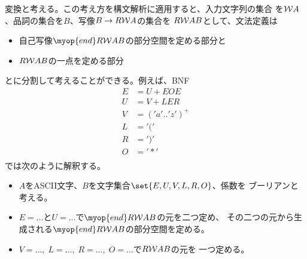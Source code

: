 \begin{todo}[やること]
\begin{description}
			変換と考える。この考え方を構文解析に適用すると、入力文字列の集合
			を$\mathcal{W}{A}$、品詞の集合を$B$、写像$B\to R\mathcal{W}{A}$の集合を
			$R\mathcal{W}{A}B$として、文法定義は
			\begin{itemize}\setlength{\itemsep}{-1mm} %
				\item 自己写像$\myop{end}R\Word{A}B$の部分空間を定める部分と
				\item $R\mathcal{W}{A}B$の一点を定める部分
			\end{itemize} %
			とに分割して考えることができる。例えば、BNF
			\begin{equation*}\begin{split} %
				E &= U + EOE \\
				U &= V + LER \\
				V &= ('a'..'z')^+ \\
				L &= '(' \\
				R &= ')' \\
				O &= '*' \\
			\end{split}\end{equation*} %
			では次のように解釈する。
			\begin{itemize}\setlength{\itemsep}{-1mm} %
				\item $A$をASCII文字、$B$を文字集合$\set{E,U,V,L,R,O}$、係数を
				ブーリアンと考える。
				\item $E=\dots$と$U=\dots$で$\myop{end}R\Word{A}B$の元を二つ定め、
				その二つの元から生成される$\myop{end}R\Word{A}B$の部分空間を定める。
				\item $V=\dots,\;L=\dots,\;R=\dots,\;O=\dots$で$R\mathcal{W}{A}B$の元を
				一つ定める。
			\end{itemize} %
		\end{description} %
	\end{todo} %
